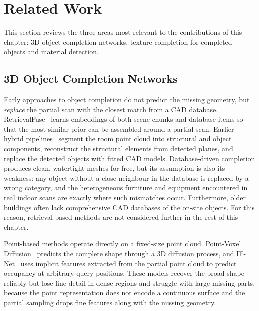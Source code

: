 \section{Related Work}
\label{sec:7_related}

This section reviews the three areas most relevant to the contributions of this chapter: 3D object completion networks, texture completion for completed objects and material detection.


\subsection{3D Object Completion Networks}
\label{sec:7_rw_completion}

Early approaches to object completion do not predict the missing geometry, but \textit{replace} the partial scan with the closest match from a CAD database. RetrievalFuse~\cite{siddiqui_retrievalfuse_2021} learns embeddings of both scene chunks and database items so that the most similar prior can be assembled around a partial scan. Earlier hybrid pipelines~\cite{li_hybrid_2024} segment the room point cloud into structural and object components, reconstruct the structural elements from detected planes, and replace the detected objects with fitted CAD models. Database-driven completion produces clean, watertight meshes for free, but its assumption is also its weakness: any object without a close neighbour in the database is replaced by a wrong category, and the heterogeneous furniture and equipment encountered in real indoor scans are exactly where such mismatches occur. Furthermore, older buildings often lack comprehensive CAD databases of the on-site objects. For this reason, retrieval-based methods are not considered further in the rest of this chapter.

Point-based methods operate directly on a fixed-size point cloud. Point-Voxel Diffusion~\cite{zhou_3d_2021} predicts the complete shape through a 3D diffusion process, and IF-Net~\cite{chibane_implicit_2020} uses implicit features extracted from the partial point cloud to predict occupancy at arbitrary query positions. These models recover the broad shape reliably but lose fine detail in dense regions and struggle with large missing parts, because the point representation does not encode a continuous surface and the partial sampling drops fine features along with the missing geometry.

